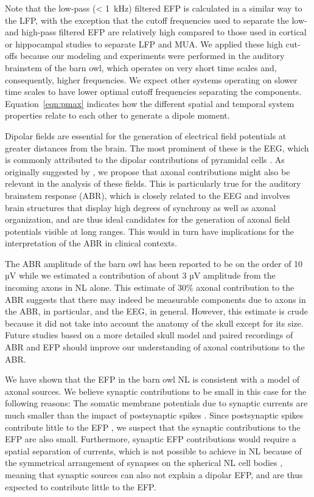\documentclass[]{elife}
\begin{document}
Note that the low-pass (\textless{} 1~kHz) filtered EFP is calculated in
a similar way to the LFP, with the exception that the cutoff frequencies
used to separate the low- and high-pass filtered EFP are relatively high
compared to those used in cortical or hippocampal studies to separate
LFP and MUA. We applied these high cut-offs because our modeling and
experiments were performed in the auditory brainstem of the barn owl,
which operates on very short time scales and, consequently, higher
frequencies. We expect other systems operating on slower time scales to
have lower optimal cutoff frequencies separating the components.
Equation~\ref{eqn:pmax} indicates how the different spatial and temporal
system properties relate to each other to generate a dipole moment.

Dipolar fields are essential for the generation of electrical field
potentials at greater distances from the brain. The most prominent of
these is the EEG, which is commonly attributed to the dipolar
contributions of pyramidal cells \citep{Nunez2006Electric}. As
originally suggested by \citet{Tenke1993Interpretation}, we propose that
axonal contributions might also be relevant in the analysis of these
fields. This is particularly true for the auditory brainstem response
(ABR), which is closely related to the EEG and involves brain structures
that display high degrees of synchrony as well as axonal organization,
and are thus ideal candidates for the generation of axonal field
potentials visible at long ranges. This would in turn have implications
for the interpretation of the ABR in clinical contexts.

The ABR amplitude of the barn owl has been reported to be on the order
of 10 µV \citep{PalancaCastan2016Binaural} while we estimated a
contribution of about 3 µV amplitude from the incoming axons in NL
alone. This estimate of 30\% axonal contribution to the ABR suggests
that there may indeed be measurable components due to axons in the ABR,
in particular, and the EEG, in general. However, this estimate is crude
because it did not take into account the anatomy of the skull except for
its size. Future studies based on a more detailed skull model and paired
recordings of ABR and EFP should improve our understanding of axonal
contributions to the ABR.

We have shown that the EFP in the barn owl NL is consistent with a model
of axonal sources. We believe synaptic contributions to be small in this
case for the following reasons: The somatic membrane potentials due to
synaptic currents are much smaller than the impact of postsynaptic
spikes \citep{Ashida2007Passive, Funabiki2011Computation}. Since
postsynaptic spikes contribute little to the EFP
\citep{Kuokkanen2010Origin}, we suspect that the synaptic contributions
to the EFP are also small. Furthermore, synaptic EFP contributions would
require a spatial separation of currents, which is not possible to
achieve in NL because of the symmetrical arrangement of synapses on the
spherical NL cell bodies \citep{carr90}, meaning that synaptic sources
can also not explain a dipolar EFP, and are thus expected to contribute
little to the EFP.
\end{document}
